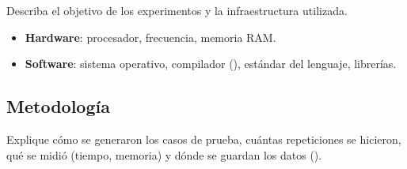 Describa el objetivo de los experimentos y la infraestructura utilizada.

\begin{itemize}
  \item \textbf{Hardware}: procesador, frecuencia, memoria RAM.
  \item \textbf{Software}: sistema operativo, compilador (), estándar del lenguaje, librerías.
\end{itemize}

\subsection{Metodología}
Explique cómo se generaron los casos de prueba, cuántas repeticiones se hicieron, qué se midió (tiempo, memoria) y dónde se guardan los datos ().
